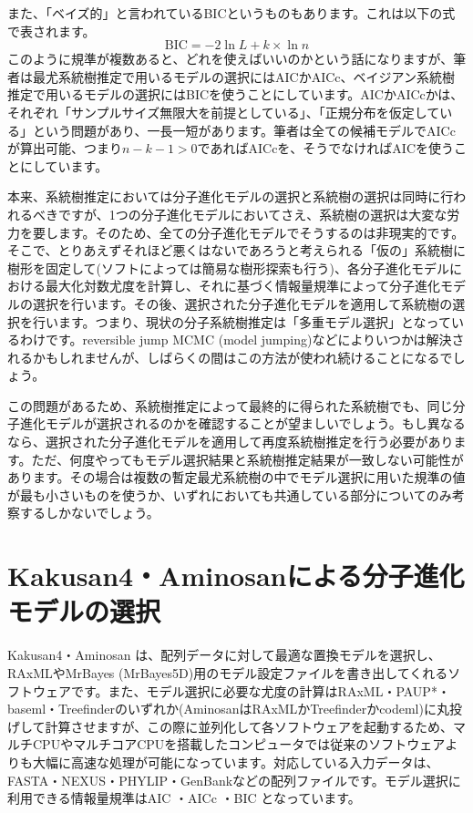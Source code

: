 \documentclass[titlepage,10pt,a4paper]{jsbook}
\begin{document}
また、「ベイズ的」と言われているBICというものもあります\citep{Schwarz1978}。これは以下の式で表されます。
\begin{equation}
\mathrm{BIC} = -2\ln{L} + k \times \ln{n}
\end{equation}
このように規準が複数あると、どれを使えばいいのかという話になりますが、筆者は最尤系統樹推定で用いるモデルの選択にはAICかAICc、ベイジアン系統樹推定で用いるモデルの選択にはBICを使うことにしています。AICかAICcかは、それぞれ「サンプルサイズ無限大を前提としている」、「正規分布を仮定している」という問題があり、一長一短があります。筆者は全ての候補モデルでAICcが算出可能、つまり$n - k - 1 > 0$であればAICcを、そうでなければAICを使うことにしています。

本来、系統樹推定においては分子進化モデルの選択と系統樹の選択は同時に行われるべきですが、1つの分子進化モデルにおいてさえ、系統樹の選択は大変な労力を要します。そのため、全ての分子進化モデルでそうするのは非現実的です。そこで、とりあえずそれほど悪くはないであろうと考えられる「仮の」系統樹に樹形を固定して(ソフトによっては簡易な樹形探索も行う)、各分子進化モデルにおける最大化対数尤度を計算し、それに基づく情報量規準によって分子進化モデルの選択を行います。その後、選択された分子進化モデルを適用して系統樹の選択を行います。つまり、現状の分子系統樹推定は「多重モデル選択」となっているわけです。reversible jump MCMC (model jumping)などによりいつかは解決されるかもしれませんが、しばらくの間はこの方法が使われ続けることになるでしょう。

この問題があるため、系統樹推定によって最終的に得られた系統樹でも、同じ分子進化モデルが選択されるのかを確認することが望ましいでしょう。もし異なるなら、選択された分子進化モデルを適用して再度系統樹推定を行う必要があります。ただ、何度やってもモデル選択結果と系統樹推定結果が一致しない可能性があります。その場合は複数の暫定最尤系統樹の中でモデル選択に用いた規準の値が最も小さいものを使うか、いずれにおいても共通している部分についてのみ考察するしかないでしょう。

\section{Kakusan4・Aminosanによる分子進化モデルの選択}

Kakusan4・Aminosan \citep{Tanabe2011}は、配列データに対して最適な置換モデルを選択し、RAxMLやMrBayes (MrBayes5D)用のモデル設定ファイルを書き出してくれるソフトウェアです。また、モデル選択に必要な尤度の計算はRAxML・PAUP*・baseml・Treefinderのいずれか(AminosanはRAxMLかTreefinderかcodeml)に丸投げして計算させますが、この際に並列化して各ソフトウェアを起動するため、マルチCPUやマルチコアCPUを搭載したコンピュータでは従来のソフトウェアよりも大幅に高速な処理が可能になっています。対応している入力データは、FASTA・NEXUS・PHYLIP・GenBankなどの配列ファイルです。モデル選択に利用できる情報量規準はAIC \citep{Akaike1974}・AICc \citep{Sugiura1978}・BIC \citep{Schwarz1978}となっています。
\end{document}
